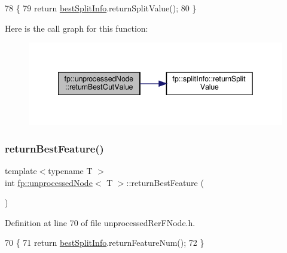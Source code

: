 \begin{DoxyCode}
78                                              \{
79                     \textcolor{keywordflow}{return} \hyperlink{classfp_1_1unprocessedNode_ae60e5f84c9a80537cb84dfd17e70e893}{bestSplitInfo}.returnSplitValue();
80                 \}
\end{DoxyCode}
Here is the call graph for this function\+:
\nopagebreak
\begin{figure}[H]
\begin{center}
\leavevmode
\includegraphics[width=342pt]{classfp_1_1unprocessedNode_ace7db1655a4f21d4d39c989ff1db806b_cgraph}
\end{center}
\end{figure}
\mbox{\label{classfp_1_1unprocessedNode_a32e9c381659db64022fa0491de48f70c}} 
\subsubsection{\texorpdfstring{return\+Best\+Feature()}{returnBestFeature()}\hspace{0.1cm}{\footnotesize\ttfamily [1/2]}}
{\footnotesize\ttfamily template$<$typename T $>$ \\
int \hyperlink{classfp_1_1unprocessedNode}{fp\+::unprocessed\+Node}$<$ T $>$\+::return\+Best\+Feature (\begin{DoxyParamCaption}{ }\end{DoxyParamCaption})\hspace{0.3cm}{\ttfamily [inline]}}



Definition at line 70 of file unprocessed\+Rer\+F\+Node.\+h.


\begin{DoxyCode}
70                                               \{
71                     \textcolor{keywordflow}{return} \hyperlink{classfp_1_1unprocessedNode_ae60e5f84c9a80537cb84dfd17e70e893}{bestSplitInfo}.returnFeatureNum();
72                 \}
\end{DoxyCode}
\mbox{\label{classfp_1_1unprocessedNode_a32e9c381659db64022fa0491de48f70c}} 
